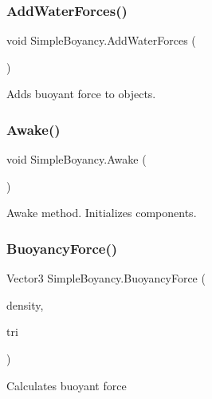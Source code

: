 \subsubsection{\texorpdfstring{Add\+Water\+Forces()}{AddWaterForces()}}
{\footnotesize\ttfamily void Simple\+Boyancy.\+Add\+Water\+Forces (\begin{DoxyParamCaption}{ }\end{DoxyParamCaption})\hspace{0.3cm}{\ttfamily [private]}}



Adds buoyant force to objects. 

\mbox{\label{class_simple_boyancy_a50976b477c44c01f1a21ba19e750b308}} 
\subsubsection{\texorpdfstring{Awake()}{Awake()}}
{\footnotesize\ttfamily void Simple\+Boyancy.\+Awake (\begin{DoxyParamCaption}{ }\end{DoxyParamCaption})\hspace{0.3cm}{\ttfamily [private]}}



Awake method. Initializes components. 

\mbox{\label{class_simple_boyancy_a6cf63e5c114b0e5679fe2e30ac7353a1}} 
\subsubsection{\texorpdfstring{Buoyancy\+Force()}{BuoyancyForce()}}
{\footnotesize\ttfamily Vector3 Simple\+Boyancy.\+Buoyancy\+Force (\begin{DoxyParamCaption}\item[{float}]{density,  }\item[{\hyperlink{struct_triangle_type}{Triangle\+Type}}]{tri }\end{DoxyParamCaption})\hspace{0.3cm}{\ttfamily [private]}}



Calculates buoyant force 



